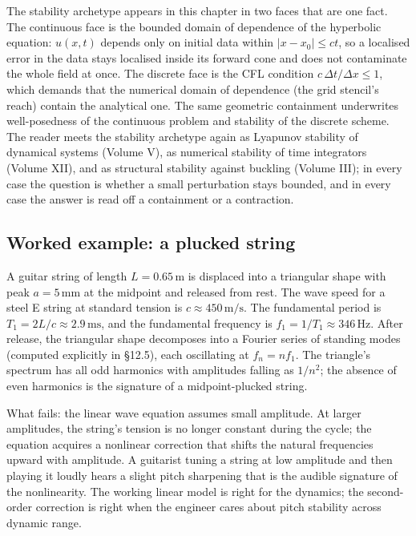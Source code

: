 \begin{archetype}
The stability archetype appears in this chapter in two faces that
are one fact. The continuous face is the bounded domain of
dependence of the hyperbolic equation: $u(x, t)$ depends only on
initial data within $|x - x_{0}| \leq c t$, so a localised error in
the data stays localised inside its forward cone and does not
contaminate the whole field at once. The discrete face is the CFL
condition $c\,\Delta t/\Delta x \leq 1$, which demands that the
numerical domain of dependence (the grid stencil's reach) contain
the analytical one. The same geometric containment underwrites
well-posedness of the continuous problem and stability of the
discrete scheme. The reader meets the stability archetype again as
Lyapunov stability of dynamical systems (Volume V), as numerical
stability of time integrators (Volume XII), and as structural
stability against buckling (Volume III); in every case the question
is whether a small perturbation stays bounded, and in every case
the answer is read off a containment or a contraction.
\end{archetype}

\subsection{Worked example: a plucked string}

A guitar string of length $L = 0.65\,\si{\meter}$ is displaced
into a triangular shape with peak $a = 5\,\si{\milli\meter}$ at
the midpoint and released from rest. The wave speed for a steel
E string at standard tension is $c \approx 450\,\si{\meter\per
\second}$. The fundamental period is $T_{1} = 2 L / c \approx
2.9\,\si{\milli\second}$, and the fundamental frequency is $f_{1}
= 1/T_{1} \approx 346\,\si{\hertz}$. After release, the
triangular shape decomposes into a Fourier series of standing
modes (computed explicitly in §12.5), each oscillating at $f_{n} =
n f_{1}$. The triangle's spectrum has all odd harmonics with
amplitudes falling as $1/n^{2}$; the absence of even harmonics is
the signature of a midpoint-plucked string.

What fails: the linear wave equation assumes small amplitude. At
larger amplitudes, the string's tension is no longer constant
during the cycle; the equation acquires a nonlinear correction
that shifts the natural frequencies upward with amplitude. A
guitarist tuning a string at low amplitude and then playing it
loudly hears a slight pitch sharpening that is the audible
signature of the nonlinearity. The working linear model is right
for the dynamics; the second-order correction is right when the
engineer cares about pitch stability across dynamic range.

